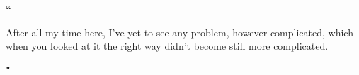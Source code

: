 \documentclass[a4paper,12pt,oneside,openright]{report}
\begin{document}
\onehalfspacing


\vspace{4cm}
\begin{center}
{\Huge \noindent \textbf{\textcolor{sections}{``}}}\\
\vspace{0.6cm}

{\huge After all my time here, I've yet to see any problem, however complicated, which when you looked at it the right way didn't become still more complicated.} %

{\vspace{0.8cm}\Huge \noindent \textbf{\textcolor{sections}{"}}}\\

\end{center}


\restoregeometry
\tableofcontents \clearpage
\listoffigures \clearpage
\listoftables \clearpage

\clearpage

\clearpage

\clearpage

\clearpage





 \setcounter{page}{1}
\renewcommand{\chaptermark}[1]{\markboth{\bf{ #1}}{}}
\renewcommand{\sectionmark}[1]{\markright{\thesection\emph{ #1}}{}}

 \pagestyle{fancy}			 %
 \fancyfoot{}				 %
 \renewcommand{\chaptermark}[1]{	 %
   \markright{{\bf\chaptername\ \thechapter.}\ #1}{}} %
 \renewcommand{\sectionmark}[1]{	 %
   \markright{\thesection.\ #1}}	 %
 \fancyhead[R,RO]{\bfseries\thepage}	 %
\fancyhead[L]{\bfseries\rightmark}	 %
\fancyhead[LO]{\bfseries\rightmark}	 %
 \renewcommand{\headrulewidth}{0.3pt}	 %
\end{document}
